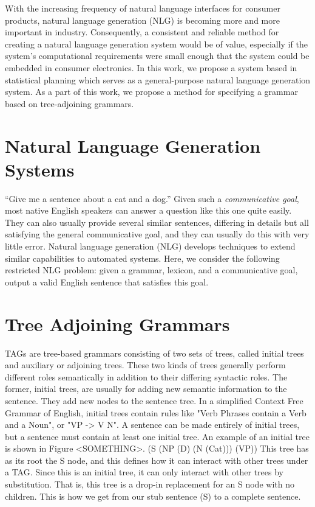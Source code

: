 With the increasing frequency of natural language interfaces for consumer
products, natural language generation (NLG) is becoming more and more important
in industry.  Consequently, a consistent and reliable method for creating a natural
language generation system would be of value, especially if the system's
computational requirements were small enough that the system could be embedded
in consumer electronics.  In this work, we propose a system based in statistical
planning which serves as a general-purpose natural language generation system.
As a part of this work, we propose a method for specifying a grammar based on
tree-adjoining grammars.

\section{Natural Language Generation Systems}
``Give me a sentence about a cat and a dog.'' Given such a {\em
  communicative goal}, most native English speakers 
can answer a question like this one quite easily.
They can also usually provide several similar sentences,
differing in details but all satisfying the general communicative goal,
and they can usually do this with very little error. Natural language generation (NLG) develops
techniques to extend similar capabilities to automated systems. 
Here, we consider the following restricted NLG problem: given a
grammar, lexicon, and a communicative goal, output a valid English
sentence that satisfies this goal.

\section{Tree Adjoining Grammars}

TAGs are tree-based grammars consisting of two sets of trees, called initial
trees and auxiliary or adjoining trees.  These two kinds of trees generally perform
different roles semantically in addition to their differing syntactic roles.  The former,
initial trees, are usually for adding new semantic information to the sentence.  They
add new nodes to the sentence tree.  In a simplified Context Free Grammar of English,
initial trees contain rules like "Verb Phrases contain a Verb and a Noun", or "VP -> V N".
A sentence can be made entirely of initial trees, but a sentence must contain at least
one initial tree.  An example of an initial tree is shown in Figure <SOMETHING>.
(S (NP (D) (N (Cat))) (VP))
This tree has as its root the S node, and this defines how it can interact with other
trees under a TAG.  Since this is an initial tree, it can only interact with other trees by
substitution.  That is, this tree is a drop-in replacement for an S node with no children.
This is how we get from our stub sentence (S) to a complete sentence.

